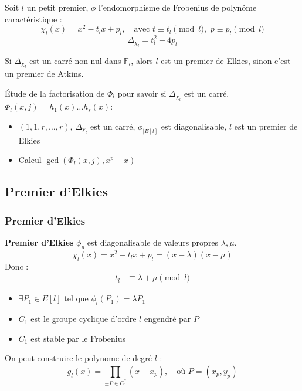 \documentclass[french]{beamer}
\begin{document}
\begin{frame}
Soit $l$ un petit premier, $\phi$ l'endomorphisme de Frobenius de polynôme caractéristique :
$$\chi_l(x) = x^2 - t_lx +p_l, \quad \text{avec } t \equiv t_l \pmod l , \, \,p \equiv p_l \pmod l$$ 
\newline 
$$\Delta_{\chi_l} = t_l^2 -4p_l $$
\begin{definition}
Si $\Delta_{\chi_l}$ est un carré non nul dans $\mathbb{F}_l$, alors $l$ est un premier de Elkies, sinon c'est un premier de Atkins.
\end{definition}
Étude de la factorisation de $\Phi_l$ pour savoir si $\Delta_{\chi_l}$ est un carré. 
\newline
$\Phi_l(x,j) = h_1(x)\ldots h_s(x)$:
\begin{itemize}
\item $(1,1,r,\ldots,r)$, $\Delta_{\chi_l}$ est un carré, $\phi_{|E[l]}$ est diagonalisable, $l$ est un premier de Elkies
\item Calcul $\gcd(\Phi_l(x,j), x^p - x)$
\end{itemize}
\end{frame}
\subsection{Premier d'Elkies}
\begin{frame}
\frametitle{Premier d'Elkies}
\textbf{Premier d'Elkies}
\newline
$\phi_p$ est diagonalisable de valeurs propres $\lambda, \mu$. 
$$\chi_l(x) = x^2 - t_lx +p_l =(x-\lambda)(x-\mu)$$
Donc :
\begin{align*}
t_l &\equiv \lambda + \mu \pmod l
\end{align*}
\begin{itemize}
\item $\exists P_1 \in E[l]$ tel que $\phi_l(P_1) = \lambda P_1$
\item $C_1$ est le groupe cyclique d'ordre $l$ engendré par $P$
\item $C_1$ est stable par le Frobenius 
\end{itemize}
On peut construire le polynome de degré $l$ :
$$ g_l(x) = \prod_{\pm P \in C_1^*} (x - x_p), \quad \text{où } P = (x_p, y_p) $$
\end{frame}
\end{document}
